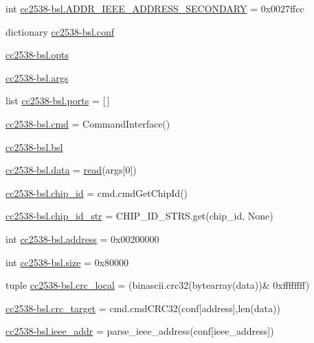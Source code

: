 \begin{DoxyCompactItemize}
\item 
int \hyperlink{namespacecc2538-bsl_a73c3339699702fa3c34c4a638042137d}{cc2538-\/bsl.\+A\+D\+D\+R\+\_\+\+I\+E\+E\+E\+\_\+\+A\+D\+D\+R\+E\+S\+S\+\_\+\+S\+E\+C\+O\+N\+D\+A\+RY} = 0x0027ffcc
\item 
dictionary \hyperlink{namespacecc2538-bsl_a5d82f1abae2dbea8333124323281acf0}{cc2538-\/bsl.\+conf}
\item 
\hyperlink{namespacecc2538-bsl_a97724a250c20159cd28af468f4bcf87c}{cc2538-\/bsl.\+opts}
\item 
\hyperlink{namespacecc2538-bsl_a8457539981eaac04c795a5924638db10}{cc2538-\/bsl.\+args}
\item 
list \hyperlink{namespacecc2538-bsl_a8a91255af8966dcea1e33e65c913e155}{cc2538-\/bsl.\+ports} = \mbox{[}$\,$\mbox{]}
\item 
\hyperlink{namespacecc2538-bsl_a1bfa087651c4e938ac35ad3210e5e7bf}{cc2538-\/bsl.\+cmd} = Command\+Interface()
\item 
\hyperlink{namespacecc2538-bsl_ac16fd91d8739889650b3a1f5e9830137}{cc2538-\/bsl.\+bsl}
\item 
\hyperlink{namespacecc2538-bsl_a3d688c81e05e22c332b51d3567cb43f7}{cc2538-\/bsl.\+data} = \hyperlink{imu__loop_8c_af97f6049272bceaff32e108f006ecc97}{read}(args\mbox{[}0\mbox{]})
\item 
\hyperlink{namespacecc2538-bsl_a7e101497379303ffcc6d03455e933c88}{cc2538-\/bsl.\+chip\+\_\+id} = cmd.\+cmd\+Get\+Chip\+Id()
\item 
\hyperlink{namespacecc2538-bsl_a5bfa5af984735320cff6f78c76c4df5d}{cc2538-\/bsl.\+chip\+\_\+id\+\_\+str} = C\+H\+I\+P\+\_\+\+I\+D\+\_\+\+S\+T\+R\+S.\+get(chip\+\_\+id, None)
\item 
int \hyperlink{namespacecc2538-bsl_ae601873d3bde248e312fdf16e2d5d01c}{cc2538-\/bsl.\+address} = 0x00200000
\item 
int \hyperlink{namespacecc2538-bsl_a19ca7ec3da8c642fa507a248ce5f2ede}{cc2538-\/bsl.\+size} = 0x80000
\item 
tuple \hyperlink{namespacecc2538-bsl_a660cdc1441c8f4f079e15d15c5f75418}{cc2538-\/bsl.\+crc\+\_\+local} = (binascii.\+crc32(bytearray(data))\& 0xffffffff)
\item 
\hyperlink{namespacecc2538-bsl_a6c6ffc33c40576c3092f41a76ea712d3}{cc2538-\/bsl.\+crc\+\_\+target} = cmd.\+cmd\+C\+R\+C32(conf\mbox{[}\textquotesingle{}address\textquotesingle{}\mbox{]},len(data))
\item 
\hyperlink{namespacecc2538-bsl_a9fce00e907fff4ee6b8c5ff384c4e3af}{cc2538-\/bsl.\+ieee\+\_\+addr} = parse\+\_\+ieee\+\_\+address(conf\mbox{[}\textquotesingle{}ieee\+\_\+address\textquotesingle{}\mbox{]})

\end{DoxyCompactItemize}

